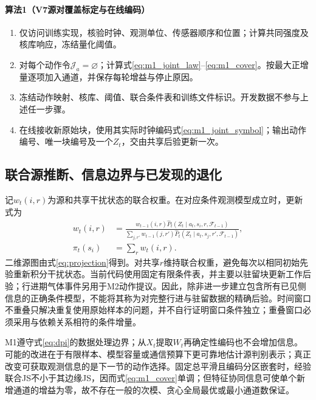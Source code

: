 \paragraph{算法1（V7源对覆盖标定与在线编码）}
\begin{enumerate}
\item 仅访问训练实现，核验时钟、观测单位、传感器顺序和位置；计算共同强度及核库响应，冻结量化阈值。
\item 对每个动作令$\mathcal J_a=\varnothing$；计算式\eqref{eq:m1_joint_law}--\eqref{eq:m1_cover}。按最大正增量逐项加入通道，并保存每轮增益与停止原因。
\item 冻结动作映射、核库、阈值、联合条件表和训练文件标识。开发数据不参与上述任一步骤。
\item 在线接收新原始块，使用其实际时钟编码式\eqref{eq:m1_joint_symbol}；输出动作编号、唯一块编号及一个$Z_t$，交由共享后验更新一次。
\end{enumerate}

\subsection{联合源推断、信息边界与已发现的退化}

记$w_t(i,r)$为源和共享干扰状态的联合权重。在对应条件观测模型成立时，更新式为
\begin{equation}
\begin{aligned}
w_t(i,r)&=\frac{w_{t-1}(i,r)
\widehat P_t(Z_t\mid a_t,s_i,r,\mathcal F_{t-1})}
{\sum_{j,r'}w_{t-1}(j,r')
\widehat P_t(Z_t\mid a_t,s_j,r',\mathcal F_{t-1})},\\
\pi_t(s_i)&=\sum_r w_t(i,r).
\end{aligned}
\label{eq:m1_posterior}
\end{equation}
二维源图由式\eqref{eq:projection}得到。对共享$r$维持联合权重，避免每次以相同初始先验重新积分干扰状态。当前代码使用固定有限条件表，并主要以驻留块更新工作后验；行进期气体事件另用于M2动作提议。因此，除非进一步建立包含所有已见侧信息的正确条件模型，不能将其称为对完整行进与驻留数据的精确后验。时间窗口不重叠只解决重复使用原始样本的问题，并不自行证明窗口条件独立；重叠窗口必须采用与依赖关系相符的条件增量。

M1遵守式\eqref{eq:dpi}的数据处理边界；从$X_t$提取$W_t$再确定性编码也不会增加信息。可能的改进在于有限样本、模型容量或通信预算下更可靠地估计源判别表示；真正改变可获取观测信息的是下一节的动作选择。固定总平滑且编码分区嵌套时，经验联合JS不小于其边缘JS，因而式\eqref{eq:m1_cover}单调；但特征协同信息可使单个新增通道的增益为零，故不存在一般的次模、贪心全局最优或最小通道数保证。

